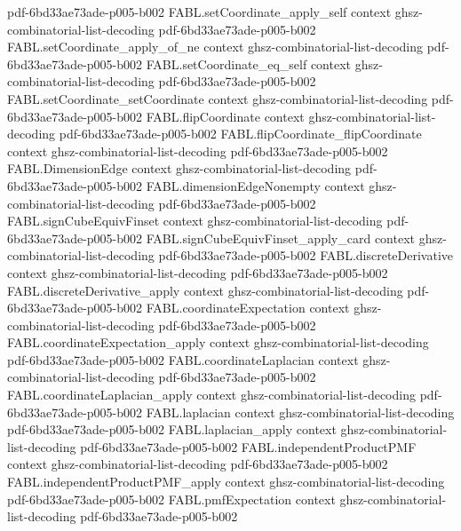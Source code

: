 \begin{theorem}
  {pdf-6bd33ae73ade-p005-b002}
\proofstep
  {FABL.setCoordinate_apply_self}
  {context}
  {ghsz-combinatorial-list-decoding}
  {pdf-6bd33ae73ade-p005-b002}
\proofstep
  {FABL.setCoordinate_apply_of_ne}
  {context}
  {ghsz-combinatorial-list-decoding}
  {pdf-6bd33ae73ade-p005-b002}
\proofstep
  {FABL.setCoordinate_eq_self}
  {context}
  {ghsz-combinatorial-list-decoding}
  {pdf-6bd33ae73ade-p005-b002}
\proofstep
  {FABL.setCoordinate_setCoordinate}
  {context}
  {ghsz-combinatorial-list-decoding}
  {pdf-6bd33ae73ade-p005-b002}
\proofstep
  {FABL.flipCoordinate}
  {context}
  {ghsz-combinatorial-list-decoding}
  {pdf-6bd33ae73ade-p005-b002}
\proofstep
  {FABL.flipCoordinate_flipCoordinate}
  {context}
  {ghsz-combinatorial-list-decoding}
  {pdf-6bd33ae73ade-p005-b002}
\proofstep
  {FABL.DimensionEdge}
  {context}
  {ghsz-combinatorial-list-decoding}
  {pdf-6bd33ae73ade-p005-b002}
\proofstep
  {FABL.dimensionEdgeNonempty}
  {context}
  {ghsz-combinatorial-list-decoding}
  {pdf-6bd33ae73ade-p005-b002}
\proofstep
  {FABL.signCubeEquivFinset}
  {context}
  {ghsz-combinatorial-list-decoding}
  {pdf-6bd33ae73ade-p005-b002}
\proofstep
  {FABL.signCubeEquivFinset_apply_card}
  {context}
  {ghsz-combinatorial-list-decoding}
  {pdf-6bd33ae73ade-p005-b002}
\proofstep
  {FABL.discreteDerivative}
  {context}
  {ghsz-combinatorial-list-decoding}
  {pdf-6bd33ae73ade-p005-b002}
\proofstep
  {FABL.discreteDerivative_apply}
  {context}
  {ghsz-combinatorial-list-decoding}
  {pdf-6bd33ae73ade-p005-b002}
\proofstep
  {FABL.coordinateExpectation}
  {context}
  {ghsz-combinatorial-list-decoding}
  {pdf-6bd33ae73ade-p005-b002}
\proofstep
  {FABL.coordinateExpectation_apply}
  {context}
  {ghsz-combinatorial-list-decoding}
  {pdf-6bd33ae73ade-p005-b002}
\proofstep
  {FABL.coordinateLaplacian}
  {context}
  {ghsz-combinatorial-list-decoding}
  {pdf-6bd33ae73ade-p005-b002}
\proofstep
  {FABL.coordinateLaplacian_apply}
  {context}
  {ghsz-combinatorial-list-decoding}
  {pdf-6bd33ae73ade-p005-b002}
\proofstep
  {FABL.laplacian}
  {context}
  {ghsz-combinatorial-list-decoding}
  {pdf-6bd33ae73ade-p005-b002}
\proofstep
  {FABL.laplacian_apply}
  {context}
  {ghsz-combinatorial-list-decoding}
  {pdf-6bd33ae73ade-p005-b002}
\proofstep
  {FABL.independentProductPMF}
  {context}
  {ghsz-combinatorial-list-decoding}
  {pdf-6bd33ae73ade-p005-b002}
\proofstep
  {FABL.independentProductPMF_apply}
  {context}
  {ghsz-combinatorial-list-decoding}
  {pdf-6bd33ae73ade-p005-b002}
\proofstep
  {FABL.pmfExpectation}
  {context}
  {ghsz-combinatorial-list-decoding}
  {pdf-6bd33ae73ade-p005-b002}
\proofstep

\end{theorem}
